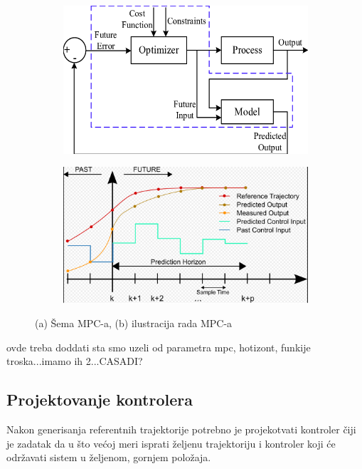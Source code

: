 \documentclass[a4paper,11pt]{article}
\theoremstyle{definition} \newtheorem{deff}{Definicija}[section]
\theoremstyle{definition} \newtheorem{prim}[deff]{Primer}
\theoremstyle{plain} \newtheorem{teor}[deff]{Teorema}
\begin{document}
	
	\begin{figure}[!htb]
		\centering
		\begin{subfigure}{0.5\linewidth}
			\centering
			\includegraphics[width=\linewidth]{slike/mpc_sc.png}
			\caption{}
			\label{fig:mpc_sc}
		\end{subfigure}
		\hfill
		\begin{subfigure}{0.48\linewidth}
			\centering
			\includegraphics[width=\linewidth]{slike/mpc.png}
			\caption{}
			\label{fig:mpc_f}
		\end{subfigure}
		\caption{(a) Šema MPC-a, (b) ilustracija rada MPC-a \cite{mpc} }
	\end{figure}
	
	
	ovde treba doddati sta smo uzeli od parametra mpc, hotizont, funkije troska...imamo ih 2...CASADI?
	
	
	\newpage
	\subsection{Projektovanje kontrolera}
	
	Nakon generisanja referentnih trajektorije potrebno je projekotvati kontroler čiji je zadatak da u što većoj meri isprati željenu trajektoriju i kontroler koji će održavati sistem u željenom, gornjem položaja. \\
	
\end{document}
